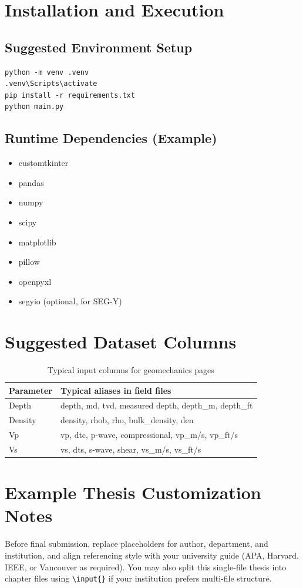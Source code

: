 \documentclass[12pt,a4paper]{report}
\begin{document}
\appendix

\chapter{Installation and Execution}
\section{Suggested Environment Setup}
\begin{lstlisting}[style=pythonstyle,caption={Example setup commands}]
python -m venv .venv
.venv\Scripts\activate
pip install -r requirements.txt
python main.py
\end{lstlisting}

\section{Runtime Dependencies (Example)}
\begin{itemize}
    \item customtkinter
    \item pandas
    \item numpy
    \item scipy
    \item matplotlib
    \item pillow
    \item openpyxl
    \item segyio (optional, for SEG-Y)
\end{itemize}

\chapter{Suggested Dataset Columns}
\begin{table}[H]
\centering
\caption{Typical input columns for geomechanics pages}
\begin{tabular}{p{4cm}p{9cm}}
\toprule
Parameter & Typical aliases in field files \\
\midrule
Depth & depth, md, tvd, measured depth, depth\_m, depth\_ft \\
Density & density, rhob, rho, bulk\_density, den \\
Vp & vp, dtc, p-wave, compressional, vp\_m/s, vp\_ft/s \\
Vs & vs, dts, s-wave, shear, vs\_m/s, vs\_ft/s \\
\bottomrule
\end{tabular}
\end{table}

\chapter{Example Thesis Customization Notes}
Before final submission, replace placeholders for author, department, and institution, and align referencing style with your university guide (APA, Harvard, IEEE, or Vancouver as required). You may also split this single-file thesis into chapter files using \texttt{\textbackslash input\{\}} if your institution prefers multi-file structure.
\end{document}
